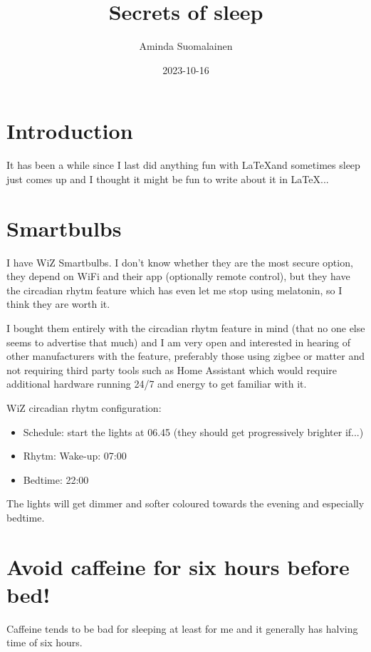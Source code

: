 \documentclass[a4paper]{rapport3}
\title{Secrets of sleep}
\author{Aminda Suomalainen}
\date{2023-10-16}
\begin{document}
\maketitle
\tableofcontents

\chapter{Introduction}

It has been a while since I last did anything fun with \LaTeX and sometimes sleep just comes up and I thought it might be fun to write about it in \LaTeX...

\chapter{Smartbulbs}

I have WiZ Smartbulbs.
I don't know whether they are the most secure option, they depend on WiFi and their app (optionally remote control), but they have the circadian rhytm feature which has even let me stop using melatonin, so I think they are worth it.

I bought them entirely with the circadian rhytm feature in mind (that no one else seems to advertise that much) and I am very open and interested in hearing of other manufacturers with the feature, preferably those using zigbee or matter and not requiring third party tools such as Home Assistant which would require additional hardware running 24/7 and energy to get familiar with it.

WiZ circadian rhytm configuration:

\begin{itemize}
    \item Schedule: start the lights at 06.45 (they should get progressively brighter if...)
    \item Rhytm: Wake-up: 07:00
    \item Bedtime: 22:00
\end{itemize}


The lights will get dimmer and softer coloured towards the evening and especially bedtime.

\chapter{Avoid caffeine for six hours before bed!}

Caffeine tends to be bad for sleeping at least for me and it generally has halving time of six hours.
\end{document}
